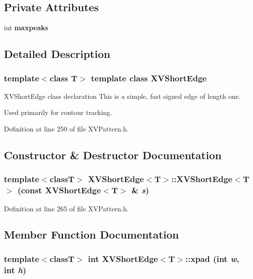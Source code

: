 \subsection*{Private Attributes}
\begin{CompactItemize}
\item 
int {\bf maxpeaks}
\end{CompactItemize}


\subsection{Detailed Description}
\subsubsection*{template$<$class T$>$  template class XVShort\-Edge}

XVShort\-Edge class declaration This is a simple, fast signed edge of length one.

Used primarily for contour tracking. 



Definition at line 250 of file XVPattern.h.

\subsection{Constructor \& Destructor Documentation}
\label{XVShortEdge_a1}
\hypertarget{class_XVShortEdge_a1}{
\subsubsection[XVShortEdge]{\setlength{\rightskip}{0pt plus 5cm}template$<$classT$>$ XVShort\-Edge$<$T$>$::XVShort\-Edge$<$T$>$ (const XVShort\-Edge$<$T$>$ \& {\em s})}}




Definition at line 265 of file XVPattern.h.

\subsection{Member Function Documentation}
\label{XVShortEdge_a2}
\hypertarget{class_XVShortEdge_a2}{
\subsubsection[xpad]{\setlength{\rightskip}{0pt plus 5cm}template$<$classT$>$ int XVShort\-Edge$<$T$>$::xpad (int {\em w}, int {\em h})}}




